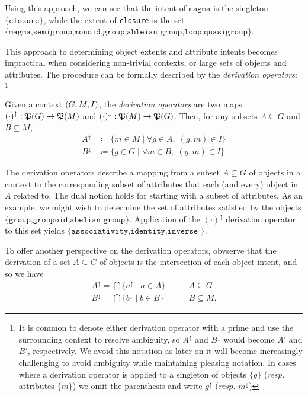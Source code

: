 Using this approach, we can see that the intent of $\texttt{magma}$ is the singleton $\{\texttt{closure}\}$, while the extent of \texttt{closure}
is the set $\{\texttt{magma,semigroup,monoid,group,ableian group,loop,quasigroup}\}$.

This approach to determining object extents and attribute intents becomes impractical when considering non-trivial contexts, or large sets of
objects and attributes. The procedure can be formally described by the \textit{derivation operators}: \footnote{It is common to denote
either derivation operator with a prime and use the surrounding context to resolve ambiguity, so $A^{\uparrow}$ and $B^{\downarrow}$ would become
$A'$ and $B'$, respectively. We avoid this notation as later on it will become increasingly challenging to avoid ambiguity while maintaining
pleasing notation. In cases where a derivation operator is applied to a singleton of objects $\{g\}$ (\textit{resp.} attributes $\{m\}$) we omit
the parenthesis and write $g^{\uparrow}$ (\textit{resp.} $m^{\downarrow}$)}

\begin{definition}
   \label{definition:derivation-operators} Given a context $(G,M,\mathrel{I})$, the \textit{derivation operators} are two maps
  $(\cdot)^{\uparrow}: \mathfrak{P}({G})\to \mathfrak{P}({M})$ and $(\cdot )^{\downarrow}: \mathfrak{P}({M})\to \mathfrak{P}({G})$. Then, for any subsets $A \subseteq G$ and $B
  \subseteq M$,
  \begin{align*}
    A^{\uparrow}   & \coloneqq \{m \in M \mid \forall g \in A, \; (g,m) \in I\} \\
    B^{\downarrow} & \coloneqq \{g \in G \mid \forall m \in B, \; (g,m) \in I\}
  \end{align*}
\end{definition}

The derivation operators describe a mapping from a subset $A \subseteq G$ of objects in a context to the corresponding subset of attributes
that each (and every) object in $A$ related to. The dual notion holds for starting with a subset of attributes. As an example, we might wish
to determine the set of attributes satisfied by the objects $\{\texttt{group,groupoid,abelian group}\}$. Application of the
$(\cdot)^{\uparrow}$ derivation operator to this set yields $\{\texttt{associativity,identity,inverse }\}$.

To offer another perspective on the derivation operators, obvserve that the derivation of a set $A\subseteq G$ of objects is the intersection
of each object intent, and so we have
\begin{align*}
  A^{\uparrow}= \bigcap \{a^{\uparrow}\mid a \in A\}     & \qquad A \subseteq G  \\
  B^{\downarrow}= \bigcap \{b^{\downarrow}\mid b \in B\} & \qquad B \subseteq M.
\end{align*}


